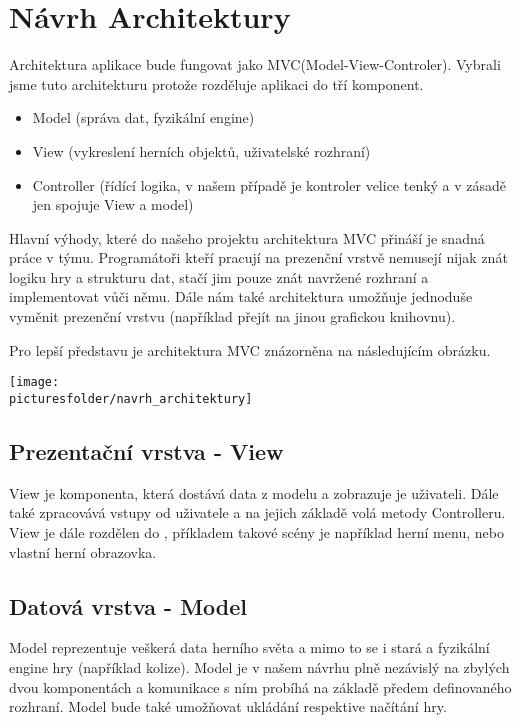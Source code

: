 \documentclass[12pt,a4paper]{article}
\def\picturesfolder{obrazky}
\begin{document}

\section{Návrh Architektury}
Architektura aplikace bude fungovat jako MVC(Model-View-Controler). Vybrali jsme
tuto architekturu protože rozděluje aplikaci do tří komponent.

\begin{itemize}
\item Model (správa dat, fyzikální engine)
\item View (vykreslení herních objektů, uživatelské rozhraní)
\item Controller (řídící logika, v našem případě je kontroler velice tenký a v zásadě jen spojuje View a model)
\end{itemize}

Hlavní výhody, které do našeho projektu architektura MVC přináší je snadná práce
v týmu. Programátoři kteří pracují na prezenční vrstvě nemusejí nijak znát
logiku hry a strukturu dat, stačí jim pouze znát navržené rozhraní a
implementovat vůči němu.  Dále nám také architektura umožňuje jednoduše vyměnit
prezenční vrstvu (například přejít na jinou grafickou knihovnu).

Pro lepší představu je architektura MVC znázorněna na následujícím obrázku.
\begin{center}
\texttt{[image: \\picturesfolder/navrh\_architektury]}
\end{center}

\subsection{Prezentační vrstva - View}
View je komponenta, která dostává data z modelu a zobrazuje je uživateli. Dále
také zpracovává vstupy od uživatele a na jejich základě volá metody Controlleru.
View je dále rozdělen do , příkladem takové scény je například herní
menu, nebo vlastní herní obrazovka.

\subsection{Datová vrstva - Model}
Model reprezentuje veškerá data herního světa a mimo to se i stará a fyzikální
engine hry (například kolize). Model je v našem návrhu plně nezávislý na
zbylých dvou komponentách a komunikace s ním probíhá na základě předem
definovaného rozhraní. Model bude také umožňovat ukládání respektive načítání
hry.
\end{document}
